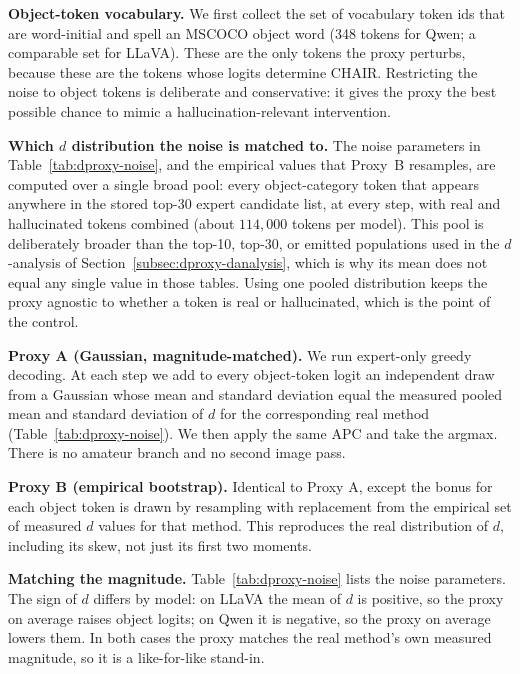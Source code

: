 \documentclass{article}
\begin{document}
\textbf{Object-token vocabulary.} We first collect the set of vocabulary token
ids that are word-initial and spell an MSCOCO object word (348 tokens for
Qwen; a comparable set for LLaVA). These are the only tokens the proxy perturbs,
because these are the tokens whose logits determine CHAIR. Restricting the noise
to object tokens is deliberate and conservative: it gives the proxy the best
possible chance to mimic a hallucination-relevant intervention.

\textbf{Which $d$ distribution the noise is matched to.} The noise parameters in
Table~\ref{tab:dproxy-noise}, and the empirical values that Proxy~B resamples, are
computed over a single broad pool: every object-category token that appears
anywhere in the stored top-30 expert candidate list, at every step, with real and
hallucinated tokens combined (about $114{,}000$ tokens per model). This pool is
deliberately broader than the top-10, top-30, or emitted populations used in the
$d$-analysis of Section~\ref{subsec:dproxy-danalysis}, which is why its mean does
not equal any single value in those tables. Using one pooled distribution keeps
the proxy agnostic to whether a token is real or hallucinated, which is the point
of the control.

\textbf{Proxy A (Gaussian, magnitude-matched).} We run expert-only greedy
decoding. At each step we add to every object-token logit an independent draw
from a Gaussian whose mean and standard deviation equal the measured pooled mean
and standard deviation of $d$ for the corresponding real method
(Table~\ref{tab:dproxy-noise}). We then apply the same APC and take the argmax.
There is no amateur branch and no second image pass.

\textbf{Proxy B (empirical bootstrap).} Identical to Proxy A, except the bonus
for each object token is drawn by resampling with replacement from the empirical
set of measured $d$ values for that method. This reproduces the real
distribution of $d$, including its skew, not just its first two moments.

\textbf{Matching the magnitude.} Table~\ref{tab:dproxy-noise} lists the noise
parameters. The sign of $d$ differs by model: on LLaVA the mean of $d$ is
positive, so the proxy on average raises object logits; on Qwen it is negative,
so the proxy on average lowers them. In both cases the proxy matches the real
method's own measured magnitude, so it is a like-for-like stand-in.
\end{document}
